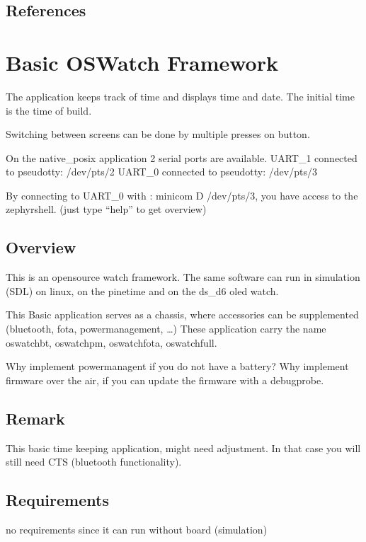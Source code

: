 \documentclass[letterpaper,10pt,english]{sphinxmanual}
\begin{document}
\subsection{References}
\label{\detokenize{samples/oswatch-fotaREADME:references}}

\section{Basic OSWatch Framework}
\label{\detokenize{samples/oswatchREADME:basic-oswatch-framework}}\label{\detokenize{samples/oswatchREADME:oswatch}}\label{\detokenize{samples/oswatchREADME::doc}}
The application keeps track of time and displays time and date.
The initial time is the time of build.

Switching between screens can be done by multiple presses on button.

On the native\_posix application 2 serial ports are available.
UART\_1 connected to pseudotty: /dev/pts/2
UART\_0 connected to pseudotty: /dev/pts/3

By connecting to UART\_0 with :  minicom \sphinxhyphen{}D /dev/pts/3, you have access to the zephyr\sphinxhyphen{}shell.
(just type “help” to get overview)


\subsection{Overview}
\label{\detokenize{samples/oswatchREADME:overview}}
This is an opensource watch framework.
The same software can run in simulation (SDL) on linux, on the pinetime and on the ds\_d6 oled watch.

This Basic application serves as a chassis, where accessories can be supplemented (bluetooth, fota, powermanagement, …)
These application carry the name oswatch\sphinxhyphen{}bt, oswatch\sphinxhyphen{}pm, oswatch\sphinxhyphen{}fota, oswatch\sphinxhyphen{}full.

Why implement powermanagent if you do not have a battery?
Why implement firmware over the air, if you can update the firmware with a debugprobe.


\subsection{Remark}
\label{\detokenize{samples/oswatchREADME:remark}}
This basic time keeping application, might need adjustment.
In that case you will still need CTS (bluetooth functionality).


\subsection{Requirements}
\label{\detokenize{samples/oswatchREADME:requirements}}
no requirements since it can run without board (simulation)
\end{document}
